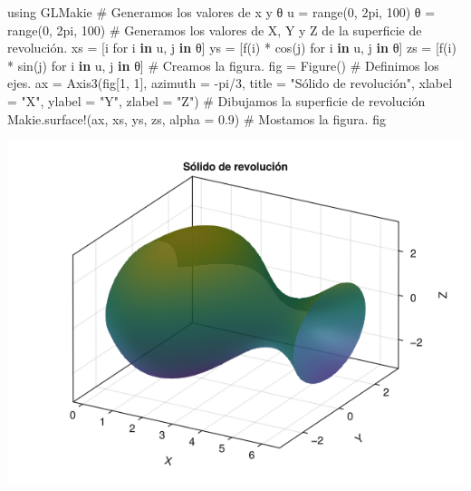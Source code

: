 \documentclass[
  a4paper,
]{scrreport}
\newenvironment{Shaded}{\begin{snugshade}}{\end{snugshade}}
\newcommand{\BuiltInTok}[1]{\textcolor[rgb]{0.00,0.23,0.31}{#1}}
\newcommand{\CommentTok}[1]{\textcolor[rgb]{0.37,0.37,0.37}{#1}}
\newcommand{\ConstantTok}[1]{\textcolor[rgb]{0.56,0.35,0.01}{#1}}
\newcommand{\FloatTok}[1]{\textcolor[rgb]{0.68,0.00,0.00}{#1}}
\newcommand{\FunctionTok}[1]{\textcolor[rgb]{0.28,0.35,0.67}{#1}}
\newcommand{\ImportTok}[1]{\textcolor[rgb]{0.00,0.46,0.62}{#1}}
\newcommand{\KeywordTok}[1]{\textcolor[rgb]{0.00,0.23,0.31}{\textbf{#1}}}
\newcommand{\NormalTok}[1]{\textcolor[rgb]{0.00,0.23,0.31}{#1}}
\newcommand{\OperatorTok}[1]{\textcolor[rgb]{0.37,0.37,0.37}{#1}}
\newcommand{\StringTok}[1]{\textcolor[rgb]{0.13,0.47,0.30}{#1}}
\theoremstyle{definition}
\theoremstyle{remark}
\begin{document}
\begin{tcolorbox}
\begin{Shaded}
\begin{Highlighting}[]
\ImportTok{using} \BuiltInTok{GLMakie}
\CommentTok{\# Generamos los valores de x y θ}
\NormalTok{u }\OperatorTok{=} \FunctionTok{range}\NormalTok{(}\FloatTok{0}\NormalTok{, }\FloatTok{2}\NormalTok{pi, }\FloatTok{100}\NormalTok{)}
\NormalTok{θ }\OperatorTok{=} \FunctionTok{range}\NormalTok{(}\FloatTok{0}\NormalTok{, }\FloatTok{2}\NormalTok{pi, }\FloatTok{100}\NormalTok{)}
\CommentTok{\# Generamos los valores de X, Y y Z de la superficie de revolución.}
\NormalTok{xs }\OperatorTok{=}\NormalTok{ [i for i }\KeywordTok{in}\NormalTok{ u, j }\KeywordTok{in}\NormalTok{ θ]}
\NormalTok{ys }\OperatorTok{=}\NormalTok{ [}\FunctionTok{f}\NormalTok{(i) }\OperatorTok{*} \FunctionTok{cos}\NormalTok{(j) for i }\KeywordTok{in}\NormalTok{ u, j }\KeywordTok{in}\NormalTok{ θ]}
\NormalTok{zs }\OperatorTok{=}\NormalTok{ [}\FunctionTok{f}\NormalTok{(i) }\OperatorTok{*} \FunctionTok{sin}\NormalTok{(j) for i }\KeywordTok{in}\NormalTok{ u, j }\KeywordTok{in}\NormalTok{ θ]}
\CommentTok{\# Creamos la figura.}
\NormalTok{fig }\OperatorTok{=} \FunctionTok{Figure}\NormalTok{()}
\CommentTok{\# Definimos los ejes.}
\NormalTok{ax }\OperatorTok{=} \FunctionTok{Axis3}\NormalTok{(fig[}\FloatTok{1}\NormalTok{, }\FloatTok{1}\NormalTok{], azimuth }\OperatorTok{=} \OperatorTok{{-}}\ConstantTok{pi}\OperatorTok{/}\FloatTok{3}\NormalTok{, title }\OperatorTok{=} \StringTok{"Sólido de revolución"}\NormalTok{, xlabel }\OperatorTok{=} \StringTok{"X"}\NormalTok{, ylabel }\OperatorTok{=} \StringTok{"Y"}\NormalTok{, zlabel }\OperatorTok{=} \StringTok{"Z"}\NormalTok{)}
\CommentTok{\# Dibujamos la superficie de revolución}
\NormalTok{Makie.}\FunctionTok{surface!}\NormalTok{(ax, xs, ys, zs, alpha }\OperatorTok{=} \FloatTok{0.9}\NormalTok{)}
\CommentTok{\# Mostamos la figura.}
\NormalTok{fig}
\end{Highlighting}
\end{Shaded}

\includegraphics{06-integrales_files/figure-pdf/cell-34-output-1.png}


\end{tcolorbox}
\end{document}
